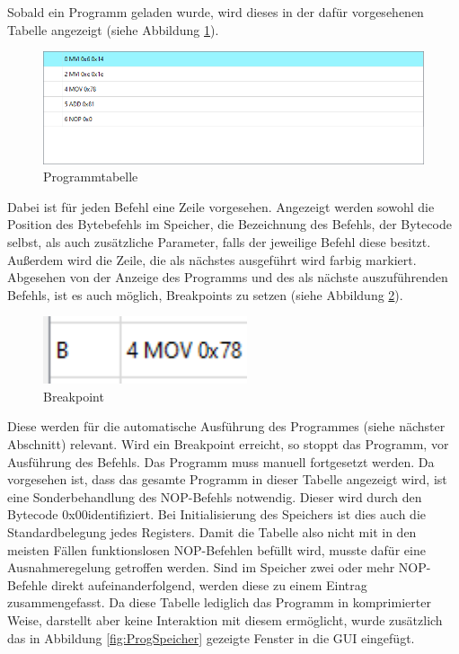 \documentclass[12pt]{article}
\newcommand{\imgSpaceBefore}{\vspace{10pt}}
\begin{document}
Sobald ein Programm geladen wurde, wird dieses in der dafür vorgesehenen Tabelle angezeigt (siehe Abbildung \ref{fig:ProgTable}).\imgSpaceBefore

\begin{figure}[H]
\centering
\includegraphics[width=15cm]{bilder/Program_table}
\caption{Programmtabelle}
\label{fig:ProgTable}
\end{figure}

\noindent
Dabei ist für jeden Befehl eine Zeile vorgesehen. Angezeigt werden sowohl die Position des Bytebefehls im Speicher, die Bezeichnung des Befehls, der Bytecode selbst, als auch zusätzliche Parameter, falls der jeweilige Befehl diese besitzt. Außerdem wird die Zeile, die als nächstes ausgeführt wird farbig markiert. Abgesehen von der Anzeige des Programms und des als nächste auszuführenden Befehls, ist es auch möglich, Breakpoints zu setzen (siehe Abbildung \ref{fig:Break}).\imgSpaceBefore

\begin{figure}[h]
\centering
\includegraphics[width=6cm]{bilder/Breakpoint}
\caption{Breakpoint}
\label{fig:Break}
\end{figure}

\noindent
Diese werden für die automatische Ausführung des Programmes (siehe nächster Abschnitt) relevant. Wird ein Breakpoint erreicht, so stoppt das Programm, vor Ausführung des Befehls. Das Programm muss manuell fortgesetzt werden. Da vorgesehen ist, dass das gesamte Programm in dieser Tabelle angezeigt wird, ist eine Sonderbehandlung des NOP-Befehls notwendig. Dieser wird durch den Bytecode \glqq 0x00\grqq identifiziert. Bei Initialisierung des Speichers ist dies auch die Standardbelegung jedes Registers. Damit die Tabelle also nicht mit in den meisten Fällen funktionslosen NOP-Befehlen befüllt wird, musste dafür eine Ausnahmeregelung getroffen werden. Sind im Speicher zwei oder mehr NOP-Befehle direkt aufeinanderfolgend, werden diese zu einem Eintrag zusammengefasst. Da diese Tabelle lediglich das Programm in komprimierter Weise, darstellt aber keine Interaktion mit diesem ermöglicht, wurde zusätzlich das in Abbildung \ref{fig:ProgSpeicher} gezeigte Fenster in die GUI eingefügt.\imgSpaceBefore
\end{document}
